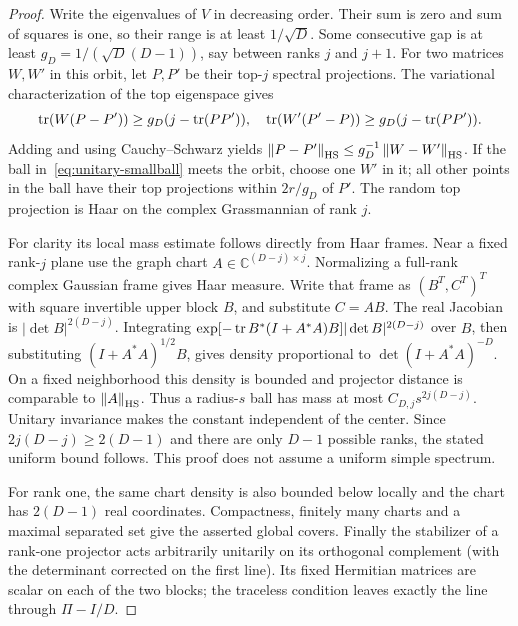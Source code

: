 \begin{proof}
Write the eigenvalues of $V$ in decreasing order. Their sum is zero and sum of squares is one, so their range is at least $1/\sqrt D$. Some consecutive gap is at least $g_D=1/(\sqrt D(D-1))$, say between ranks $j$ and $j+1$. For two matrices $W,W'$ in this orbit, let $P,P'$ be their top-$j$ spectral projections. The variational characterization of the top eigenspace gives
\[
 \operatorname{tr}(W(P-P'))\ge g_D(j-\operatorname{tr}(PP')),
 \quad \operatorname{tr}(W'(P'-P))\ge g_D(j-\operatorname{tr}(PP')).
\]
Adding and using Cauchy--Schwarz yields
$\left\lVert P-P'\right\rVert_{\rm HS}\le g_D^{-1}\left\lVert W-W'\right\rVert_{\rm HS}$.
If the ball in~\eqref{eq:unitary-smallball} meets the orbit, choose one $W'$ in it; all other points in the ball have their top projections within $2r/g_D$ of $P'$. The random top projection is Haar on the complex Grassmannian of rank $j$.

For clarity its local mass estimate follows directly from Haar frames. Near a fixed rank-$j$ plane use the graph chart $A\in\mathbb C^{(D-j)\times j}$. Normalizing a full-rank complex Gaussian frame gives Haar measure. Write that frame as $(B^T,C^T)^T$ with square invertible upper block $B$, and substitute $C=AB$. The real Jacobian is $|\det B|^{2(D-j)}$. Integrating $\exp[-\operatorname{tr} B^*(I+A^*A)B]|\det B|^{2(D-j)}$ over $B$, then substituting $(I+A^*A)^{1/2}B$, gives density proportional to $\det(I+A^*A)^{-D}$. On a fixed neighborhood this density is bounded and projector distance is comparable to $\left\lVert A\right\rVert_{\rm HS}$. Thus a radius-$s$ ball has mass at most $C_{D,j}s^{2j(D-j)}$. Unitary invariance makes the constant independent of the center. Since $2j(D-j)\ge2(D-1)$ and there are only $D-1$ possible ranks, the stated uniform bound follows. This proof does not assume a uniform simple spectrum.

For rank one, the same chart density is also bounded below locally and the chart has $2(D-1)$ real coordinates. Compactness, finitely many charts and a maximal separated set give the asserted global covers. Finally the stabilizer of a rank-one projector acts arbitrarily unitarily on its orthogonal complement (with the determinant corrected on the first line). Its fixed Hermitian matrices are scalar on each of the two blocks; the traceless condition leaves exactly the line through $\Pi-I/D$.
\end{proof}

